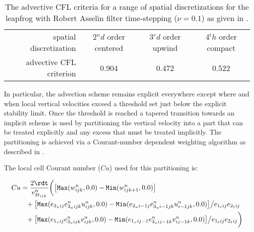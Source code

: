 \documentclass[../main/NEMO_manual]{subfiles}
\begin{document}
\begin{table}[htbp]
  \centering
  \begin{tabular}{r|ccc}
    \hline
    spatial discretization  & 2$^nd$ order centered & 3$^rd$ order upwind & 4$^th$ order compact \\
    advective CFL criterion &                 0.904 &              0.472  &                0.522 \\
    \hline
  \end{tabular}
  \caption[Advective CFL criteria for the leapfrog with Robert Asselin filter time-stepping]{
    The advective CFL criteria for a range of spatial discretizations for
    the leapfrog with Robert Asselin filter time-stepping
    ($\nu=0.1$) as given in \citep{lemarie.debreu.ea_OM15}.}
  \label{tab:ZDF_zad_Aimp_CFLcrit}
\end{table}

In particular, the advection scheme remains explicit everywhere except where and when
local vertical velocities exceed a threshold set just below the explicit stability limit.
Once the threshold is reached a tapered transition towards an implicit scheme is used by
partitioning the vertical velocity into a part that can be treated explicitly and any
excess that must be treated implicitly. The partitioning is achieved via a Courant-number
dependent weighting algorithm as described in \citep{shchepetkin_OM15}.

The local cell Courant number ($Cu$) used for this partitioning is:

\begin{equation}
  \label{eq:ZDF_Eqn_zad_Aimp_Courant}
  \begin{split}
    Cu &= {2 \rdt \over e^n_{3t_{ijk}}} \bigg (\big [ \texttt{Max}(w^n_{ijk},0.0) - \texttt{Min}(w^n_{ijk+1},0.0) \big ]    \\
       &\phantom{=} +\big [ \texttt{Max}(e_{{2_u}ij}e^n_{{3_{u}}ijk}u^n_{ijk},0.0) - \texttt{Min}(e_{{2_u}i-1j}e^n_{{3_{u}}i-1jk}u^n_{i-1jk},0.0) \big ]
                     \big / e_{{1_t}ij}e_{{2_t}ij}            \\
       &\phantom{=} +\big [ \texttt{Max}(e_{{1_v}ij}e^n_{{3_{v}}ijk}v^n_{ijk},0.0) - \texttt{Min}(e_{{1_v}ij-1}e^n_{{3_{v}}ij-1k}v^n_{ij-1k},0.0) \big ]
                     \big / e_{{1_t}ij}e_{{2_t}ij} \bigg )    \\
  \end{split}
\end{equation}
\end{document}

